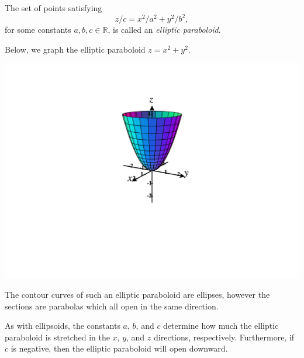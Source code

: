 \documentclass{ximera}
\begin{document}
\begin{example}
The set of points satisfying
\[
z/c = x^2/a^2 + y^2/b^2,
\]
for some constants $a,b,c\in\mathbb{R}$, is called an \emph{elliptic paraboloid}.

Below, we graph the elliptic paraboloid $z=x^2+y^2$.


\begin{image}
\includegraphics[width = \textwidth]{CalcPlot3D-paraboloid}
\end{image}

The contour curves of such an elliptic paraboloid are ellipses, however the sections are parabolas which all open in the same direction.

As with ellipsoids, the constants $a$, $b$, and $c$ determine how much the elliptic paraboloid is stretched in the $x$, $y$, and $z$ directions, respectively. Furthermore, if $c$ is negative, then the elliptic paraboloid will open downward.
\end{example}
\end{document}
